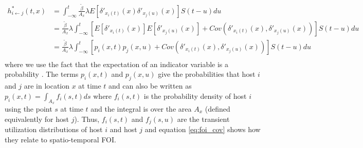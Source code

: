 \documentclass[letterpaper]{article}
\begin{document}
\begin{equation}
    \begin{aligned}
        h^*_{i \leftarrow j}(t, x) &= \int_{-\infty}^{t} \frac{\tilde{\beta}}{A_x} \lambda E[\delta'_{x_i(t)}(x) \delta'_{x_j(u)}(x)] S(t - u) du \\
        &= \frac{\tilde{\beta}}{A_x} \lambda \int_{-\infty}^{t} [E[\delta'_{x_i(t)}(x)] E[\delta'_{x_j(u)}(x)] + Cov(\delta'_{x_i(t)}(x), \delta'_{x_j(u)}(x))] S(t - u) du \\
        &= \frac{\tilde{\beta}}{A_x} \lambda \int_{-\infty}^{t} [p_i(x, t) p_j(x, u) + Cov(\delta'_{x_i(t)}(x), \delta'_{x_j(u)}(x))] S(t - u) du \\
    \end{aligned}
    \label{eq:foi_cov}
\end{equation}
where we use the fact that the expectation of an indicator variable is a probability \citep{Grimmett2001}. The terms $p_i(x, t)$ and $p_j(x,u)$ give the probabilities that host $i$ and $j$ are in location $x$ at time $t$ and can also be written as $p_i(x, t) = \int_{A_x} f_i(s, t) ds$ where $f_i(s, t)$ is the probability density of host $i$ using the point $s$ at time $t$ and the integral is over the area $A_x$ (defined equivalently for host $j$). Thus, $f_i(s, t)$ and $f_j(s, u)$ are the transient utilization distributions of host $i$ and host $j$ and equation \ref{eq:foi_cov} shows how they relate to spatio-temporal FOI.


\end{document}
